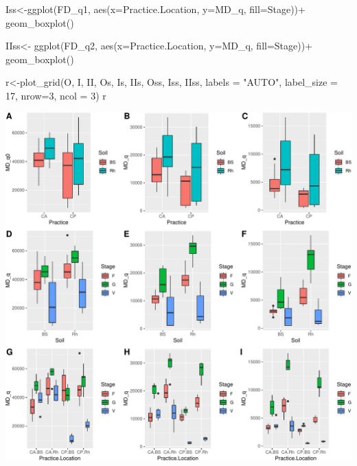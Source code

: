 \documentclass[]{interact}
\theoremstyle{plain}%
\theoremstyle{definition}
\theoremstyle{remark}
\newenvironment{Shaded}{\begin{snugshade}}{\end{snugshade}}
\newcommand{\AttributeTok}[1]{\textcolor[rgb]{0.77,0.63,0.00}{#1}}
\newcommand{\DecValTok}[1]{\textcolor[rgb]{0.00,0.00,0.81}{#1}}
\newcommand{\FunctionTok}[1]{\textcolor[rgb]{0.00,0.00,0.00}{#1}}
\newcommand{\NormalTok}[1]{#1}
\newcommand{\OtherTok}[1]{\textcolor[rgb]{0.56,0.35,0.01}{#1}}
\newcommand{\SpecialCharTok}[1]{\textcolor[rgb]{0.00,0.00,0.00}{#1}}
\newcommand{\StringTok}[1]{\textcolor[rgb]{0.31,0.60,0.02}{#1}}
\begin{document}
\begin{Shaded}
\begin{Highlighting}[]
\NormalTok{Iss}\OtherTok{\textless{}{-}}\FunctionTok{ggplot}\NormalTok{(FD\_q1, }\FunctionTok{aes}\NormalTok{(}\AttributeTok{x=}\NormalTok{Practice.Location, }\AttributeTok{y=}\NormalTok{MD\_q, }\AttributeTok{fill=}\NormalTok{Stage))}\SpecialCharTok{+}
  \FunctionTok{geom\_boxplot}\NormalTok{()}

\NormalTok{IIss}\OtherTok{\textless{}{-}} \FunctionTok{ggplot}\NormalTok{(FD\_q2, }\FunctionTok{aes}\NormalTok{(}\AttributeTok{x=}\NormalTok{Practice.Location, }\AttributeTok{y=}\NormalTok{MD\_q, }\AttributeTok{fill=}\NormalTok{Stage))}\SpecialCharTok{+}
  \FunctionTok{geom\_boxplot}\NormalTok{()}

\NormalTok{r}\OtherTok{\textless{}{-}}\FunctionTok{plot\_grid}\NormalTok{(O, I, II, Os, Is, IIs, Oss, Iss, IIss, }
          \AttributeTok{labels =} \StringTok{"AUTO"}\NormalTok{, }
          \AttributeTok{label\_size =} \DecValTok{17}\NormalTok{, }\AttributeTok{nrow=}\DecValTok{3}\NormalTok{, }\AttributeTok{ncol =} \DecValTok{3}\NormalTok{)}
\NormalTok{r}
\end{Highlighting}
\end{Shaded}

\begin{center}\includegraphics{Doc_pdf_files/figure-latex/unnamed-chunk-13-1} \end{center}
\end{document}
